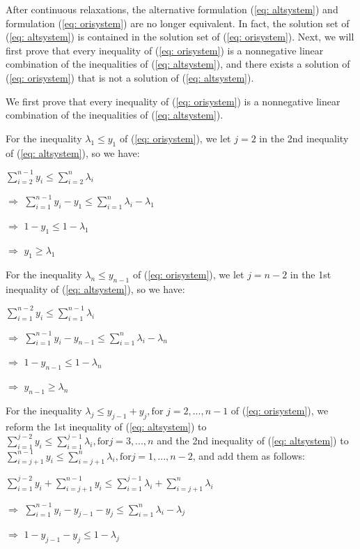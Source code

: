 After continuous relaxations, the alternative formulation (\ref{eq: altsystem}) and formulation (\ref{eq: orisystem}) are no longer equivalent. In fact, the solution set of (\ref{eq: altsystem}) is contained in the solution set of (\ref{eq: orisystem}). Next, we will first prove that every inequality of (\ref{eq: orisystem}) is a nonnegative linear combination of the inequalities of (\ref{eq: altsystem}), and there exists a solution of (\ref{eq: orisystem}) that is not a solution of (\ref{eq: altsystem}).

We first prove that every inequality of (\ref{eq: orisystem}) is a nonnegative linear combination of the inequalities of (\ref{eq: altsystem}). 

For the inequality $\lambda_1\leq{}y_1$ of  (\ref{eq: orisystem}), we let $j=2$ in the 2nd inequality of (\ref{eq: altsystem}), so we have:

$\sum_{i=2}^{n-1} y_i\leq{}\sum_{i=2}^{n} \lambda_i$

$\Rightarrow$ $\sum_{i=1}^{n-1} y_i - y_1\leq{}\sum_{i=1}^{n} \lambda_i - \lambda_1$

$\Rightarrow$ $1 - y_1\leq{}1 - \lambda_1$

$\Rightarrow$ $y_1\geq{}\lambda_1$

For the inequality $\lambda_n\leq{}y_{n-1}$ of  (\ref{eq: orisystem}), we let $j=n-2$ in the 1st inequality of (\ref{eq: altsystem}), so we have:

$\sum_{i=1}^{n-2} y_i\leq{}\sum_{i=1}^{n-1} \lambda_i$

$\Rightarrow$ $\sum_{i=1}^{n-1} y_i - y_{n-1}\leq{}\sum_{i=1}^{n} \lambda_i - \lambda_n$

$\Rightarrow$ $1 - y_{n-1}\leq{}1 - \lambda_n$

$\Rightarrow$ $y_{n-1}\geq{} \lambda_n$

For the inequality $\lambda_j\leq{}y_{j-1}+y_j, \text{for } j=2,...,n-1$ of  (\ref{eq: orisystem}), we reform the 1st inequality of (\ref{eq: altsystem}) to  $\sum_{i=1}^{j-2} y_i\leq{}\sum_{i=1}^{j-1} \lambda_i, \text{for} j=3,...,n$ and the 2nd inequality of (\ref{eq: altsystem}) to  $\sum_{i=j+1}^{n-1} y_i\leq{}\sum_{i=j+1}^{n} \lambda_i, \text{for} j=1,...,n-2$, and add them as follows:

$\sum_{i=1}^{j-2} y_i+\sum_{i=j+1}^{n-1} y_i\leq{}\sum_{i=1}^{j-1}\lambda_i+\sum_{i=j+1}^{n} \lambda_i$

$\Rightarrow$ $\sum_{i=1}^{n-1} y_i-y_{j-1}-y_j\leq{}\sum_{i=1}^{n}\lambda_i-\lambda_j$

$\Rightarrow$ $1-y_{j-1}-y_j\leq{}1-\lambda_j$

